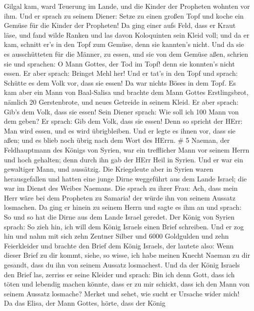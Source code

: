 Gilgal kam, ward Teuerung im Lande, und die Kinder der Propheten wohnten
vor ihm. Und er sprach zu seinem Diener: Setze zu einen großen Topf und
koche ein Gemüse für die Kinder der Propheten!  Da ging
einer aufs Feld, dass er Kraut läse, und fand wilde Ranken und las davon
Koloquinten sein Kleid voll; und da er kam, schnitt er's in den Topf zum
Gemüse, denn sie kannten's nicht.  Und da sie es
ausschütteten für die Männer, zu essen, und sie von dem Gemüse aßen,
schrien sie und sprachen: O Mann Gottes, der Tod im Topf! denn sie
konnten's nicht essen.  Er aber sprach: Bringet Mehl her!
Und er tat's in den Topf und sprach: Schütte es dem Volk vor, dass sie
essen! Da war nichts Böses in dem Topf.  Es kam aber ein
Mann von Baal-Salisa und brachte dem Mann Gottes Erstlingsbrot, nämlich
20 Gerstenbrote, und neues Getreide in seinem Kleid. Er aber sprach:
Gib's dem Volk, dass sie essen!  Sein Diener sprach: Wie
soll ich 100 Mann von dem geben? Er sprach: Gib dem Volk, dass sie
essen! Denn so spricht der HErr: Man wird essen, und es wird
übrigbleiben.  Und er legte es ihnen vor, dass sie aßen;
und es blieb noch übrig nach dem Wort des HErrn. \# 5 
Naeman, der Feldhauptmann des Königs von Syrien, war ein trefflicher
Mann vor seinem Herrn und hoch gehalten; denn durch ihn gab der HErr
Heil in Syrien. Und er war ein gewaltiger Mann, und aussätzig.
 Die Kriegsleute aber in Syrien waren herausgefallen und
hatten eine junge Dirne weggeführt aus dem Lande Israel; die war im
Dienst des Weibes Naemans.  Die sprach zu ihrer Frau: Ach,
dass mein Herr wäre bei dem Propheten zu Samaria! der würde ihn von
seinem Aussatz losmachen.  Da ging er hinein zu seinem Herrn
und sagte es ihm an und sprach: So und so hat die Dirne aus dem Lande
Israel geredet.  Der König von Syrien sprach: So zieh hin,
ich will dem König Israels einen Brief schreiben. Und er zog hin und
nahm mit sich zehn Zentner Silber und 6000 Goldgulden und zehn
Feierkleider  und brachte den Brief dem König Israels, der
lautete also: Wenn dieser Brief zu dir kommt, siehe, so wisse, ich habe
meinen Knecht Naeman zu dir gesandt, dass du ihn von seinem Aussatz
losmachest.  Und da der König Israels den Brief las, zerriss
er seine Kleider und sprach: Bin ich denn Gott, dass ich töten und
lebendig machen könnte, dass er zu mir schickt, dass ich den Mann von
seinem Aussatz losmache? Merket und sehet, wie sucht er Ursache wider
mich!  Da das Elisa, der Mann Gottes, hörte, dass der König
